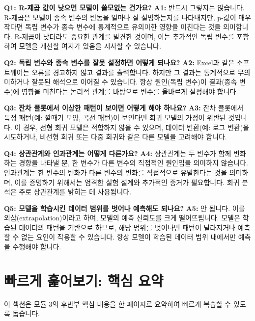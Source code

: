 \documentclass[11pt,a4paper]{article}
\theoremstyle{definition}
\begin{document}
\begin{tcolorbox}[colback=lightblue,colframe=darkblue,title={자주 묻는 질문}]
\textbf{Q1: R-제곱 값이 낮으면 모델이 쓸모없는 건가요?}
\textbf{A1:} 반드시 그렇지는 않습니다. R-제곱은 모델이 종속 변수의 변동을 얼마나 잘 설명하는지를 나타내지만, p-값이 매우 작다면 독립 변수가 종속 변수에 통계적으로 유의미한 영향을 미친다는 것을 의미합니다. R-제곱이 낮더라도 중요한 관계를 발견한 것이며, 이는 추가적인 독립 변수를 포함하여 모델을 개선할 여지가 있음을 시사할 수 있습니다.

\textbf{Q2: 독립 변수와 종속 변수를 잘못 설정하면 어떻게 되나요?}
\textbf{A2:} Excel과 같은 소프트웨어는 오류를 경고하지 않고 결과를 출력합니다. 하지만 그 결과는 통계적으로 무의미하거나 잘못된 해석으로 이어질 수 있습니다. 항상 원인(독립 변수)이 결과(종속 변수)에 영향을 미친다는 논리적 관계를 바탕으로 변수를 올바르게 설정해야 합니다.

\textbf{Q3: 잔차 플롯에서 이상한 패턴이 보이면 어떻게 해야 하나요?}
\textbf{A3:} 잔차 플롯에서 특정 패턴(예: 깔때기 모양, 곡선 패턴)이 보인다면 회귀 모델의 가정이 위반된 것입니다. 이 경우, 선형 회귀 모델은 적합하지 않을 수 있으며, 데이터 변환(예: 로그 변환)을 시도하거나, 비선형 회귀 또는 다중 회귀와 같은 다른 모델을 고려해야 합니다.

\textbf{Q4: 상관관계와 인과관계는 어떻게 다른가요?}
\textbf{A4:} 상관관계는 두 변수가 함께 변화하는 경향을 나타낼 뿐, 한 변수가 다른 변수의 직접적인 원인임을 의미하지 않습니다. 인과관계는 한 변수의 변화가 다른 변수의 변화를 직접적으로 유발한다는 것을 의미하며, 이를 증명하기 위해서는 엄격한 실험 설계와 추가적인 증거가 필요합니다. 회귀 분석은 주로 상관관계를 밝히는 데 사용됩니다.

\textbf{Q5: 모델을 학습시킨 데이터 범위를 벗어나 예측해도 되나요?}
\textbf{A5:} 안 됩니다. 이를 외삽(extrapolation)이라고 하며, 모델의 예측 신뢰도를 크게 떨어뜨립니다. 모델은 학습된 데이터의 패턴을 기반으로 하므로, 해당 범위를 벗어나면 패턴이 달라지거나 예측할 수 없는 요인이 작용할 수 있습니다. 항상 모델이 학습된 데이터 범위 내에서만 예측을 수행해야 합니다.
\end{tcolorbox}

\newpage
\section{빠르게 훑어보기: 핵심 요약}
이 섹션은 모듈 3의 후반부 핵심 내용을 한 페이지로 요약하여 빠르게 복습할 수 있도록 돕습니다.
\end{document}
